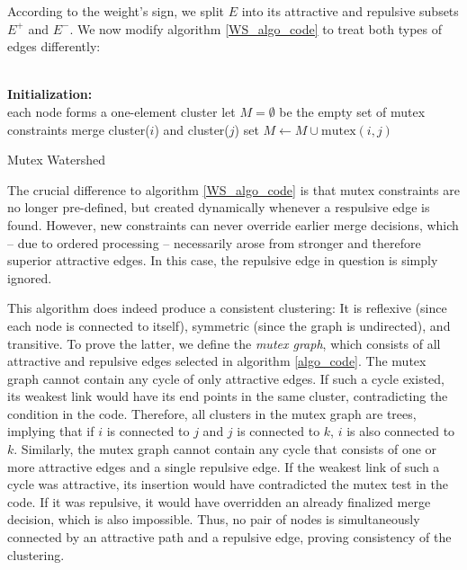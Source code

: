 According to the weight's sign, we split $E$ into its attractive and repulsive subsets $E^+$ and $E^-$. We now modify algorithm \ref{WS_algo_code} to treat both types of edges differently:
\begin{algorithm}
 \hrulefill \\
 \textbf{Initialization:}\\
     each node forms a one-element cluster\;
     let $M = \emptyset$ be the empty set of mutex constraints\;
 {
   {
      {
        merge cluster($i$) and cluster($j$)\;
      }
   }{
      {
        set $M \leftarrow M \cup \mathrm{mutex}(i, j)$\;
      }
   }
 } \vspace{-6pt}\hrulefill
 \caption{Mutex Watershed}
 \label{algo_code}
\end{algorithm}

\noindent The crucial difference to algorithm \ref{WS_algo_code} is that mutex constraints are no longer pre-defined, but created dynamically whenever a respulsive edge is found. However, new constraints can never override earlier merge decisions, which -- due to ordered processing  -- necessarily arose from stronger and therefore superior attractive edges. In this case, the repulsive edge in question is simply ignored. 

This algorithm does indeed produce a consistent clustering: It is reflexive (since each node is connected to itself), symmetric (since the graph is undirected), and transitive. To prove the latter, we define the {\em mutex graph}, which consists of all attractive and repulsive edges selected in algorithm \ref{algo_code}. The mutex graph cannot contain any cycle of only attractive edges. If such a cycle existed, its weakest link would have its end points in the same cluster, contradicting the condition in the code. Therefore, all clusters in the mutex graph are trees, implying that if $i$ is connected to $j$ and $j$ is connected to $k$, $i$ is also connected to $k$. Similarly, the mutex graph cannot contain any cycle that consists of one or more attractive edges and a single repulsive edge. If the weakest link of such a cycle was attractive, its insertion would have contradicted the mutex test in the code. If it was repulsive, it would have overridden an already finalized merge decision, which is also impossible. Thus, no pair of nodes is simultaneously connected by an attractive path and a repulsive edge, proving consistency of the clustering.

